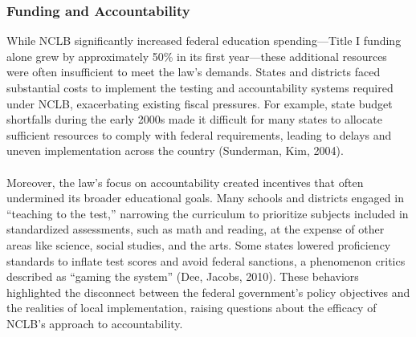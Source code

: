 \documentclass[11pt]{extarticle}
\begin{document}
\subsubsection{Funding and Accountability}
While NCLB significantly increased federal education spending—Title I funding alone grew by approximately 50\% in its first year—these additional resources were often insufficient to meet the law’s demands. 
States and districts faced substantial costs to implement the testing and accountability systems required under NCLB, exacerbating existing fiscal pressures. 
For example, state budget shortfalls during the early 2000s made it difficult for many states to allocate sufficient resources to comply with federal requirements, leading to delays and uneven implementation across the country (Sunderman, Kim, 2004).\\
\\
Moreover, the law’s focus on accountability created incentives that often undermined its broader educational goals. Many schools and districts engaged in ``teaching to the test,” narrowing the curriculum to prioritize subjects included in standardized assessments, such as math and reading, at the expense of other areas like science, social studies, and the arts. Some states lowered proficiency standards to inflate test scores and avoid federal sanctions, a phenomenon critics described as “gaming the system” (Dee, Jacobs, 2010).
These behaviors highlighted the disconnect between the federal government’s policy objectives and the realities of local implementation, raising questions about the efficacy of NCLB’s approach to accountability.
\end{document}
